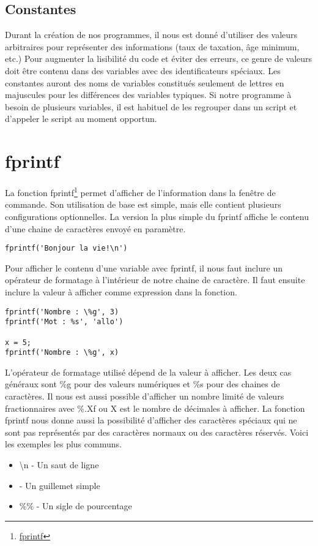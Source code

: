 \documentclass{tufte-handout}
\begin{document}
\subsection{Constantes}
Durant la création de nos programmes, il nous est donné d'utiliser des valeurs arbitraires pour représenter des informations (taux de taxation, âge minimum, etc.) Pour augmenter la lisibilité du code et éviter des erreurs, ce genre de valeurs doit être contenu dans des variables avec des identificateurs spéciaux. Les constantes auront des noms de variables constitués seulement de lettres en majuscules pour les différences des variables typiques.
Si notre programme à besoin de plusieurs variables, il est habituel de les regrouper dans un script et d'appeler le script au moment opportun.

\section{fprintf}
La fonction fprintf\footnote{\href{https://www.mathworks.com/help/matlab/ref/fprintf.html}{fprintf}} permet d'afficher de l'information dans la fenêtre de commande. Son utilisation de base est simple, mais elle contient plusieurs configurations optionnelles.
La version la plus simple du fprintf affiche le contenu d'une chaine de caractères envoyé en paramètre.
\begin{lstlisting}[title={Simple fprintf}]
fprintf('Bonjour la vie!\n')
\end{lstlisting}
Pour afficher le contenu d'une variable avec fprintf, il nous faut inclure un opérateur de formatage à l'intérieur de notre chaine de caractère. Il faut ensuite inclure la valeur à afficher comme expression dans la fonction.
\begin{lstlisting}[title={fprintf avec opérateur de formatage}]
fprintf('Nombre : \%g', 3)
fprintf('Mot : %s', 'allo')

x = 5;
fprintf('Nombre : \%g', x)
\end{lstlisting}
L'opérateur de formatage utilisé dépend de la valeur à afficher. Les deux cas généraux sont \%g pour des valeurs numériques et \%s pour des chaines de caractères. Il nous est aussi possible d'afficher un nombre limité de valeurs fractionnaires avec \%.Xf ou X est le nombre de décimales à afficher.
La fonction fprintf nous donne aussi la possibilité d'afficher des caractères spéciaux qui ne sont pas représentés par des caractères normaux ou des caractères réservés. Voici les exemples les plus communs.
\begin{itemize}
    \item \textbackslash{}n - Un saut de ligne
    \item \textquotesingle\textquotesingle - Un guillemet simple
    \item \%\% - Un sigle de pourcentage
\end{itemize}
\end{document}
